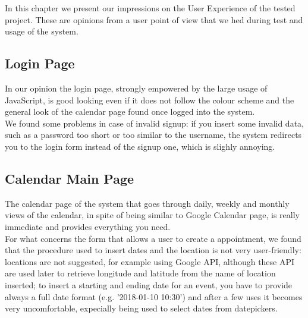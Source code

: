 In this chapter we present our impressions on the User Experience of the tested project. These are opinions from a user point of view that we hed during test and usage of the system.

\subsection{Login Page}
In our opinion the login page, strongly empowered by the large usage of JavaScript, is good looking even if it does not follow the colour scheme and the general look of the calendar page found once logged into the system. \\
We found some problems in case of invalid signup: if you insert some invalid data, such as a password too short or too similar to the username, the system redirects you to the login form instead of the signup one, which is slighly annoying.

\subsection{Calendar Main Page}
The calendar page of the system that goes through daily, weekly and monthly views of the calendar, in spite of being similar to Google Calendar page, is really immediate and provides everything you need. \\
For what concerns the form that allows a user to create a appointment, we found that the procedure used to insert dates and the location is not very user-friendly: locations are not suggested, for example using Google API, although these API are used later to retrieve longitude and latitude from the name of location inserted; to insert a starting and ending date for an event, you have to provide always a full date format (e.g. '2018-01-10 10:30') and after a few uses it becomes very uncomfortable, expecially being used to select dates from datepickers.

